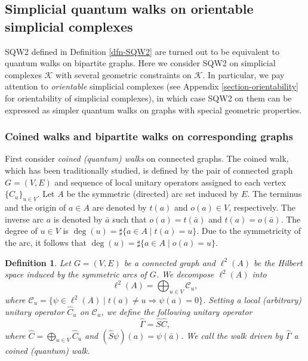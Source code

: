 \documentclass[a4paper,12pt]{article}
\newtheorem{definition}{Definition}[section]
\numberwithin{equation}{section}
\begin{document}
%
\subsection{Simplicial quantum walks on orientable simplicial complexes}
%
SQW2 defined in Definition \ref{dfn-SQW2} are turned out to be equivalent to quantum walks on bipartite graphs.
Here we consider SQW2 on simplicial complexes $\mathcal{K}$ with several geometric constraints on $\mathcal{K}$.
In particular, we pay attention to {\em orientable} simplicial complexes (see Appendix \ref{section-orientability} for orientability of simplicial complexes), in which case SQW2 on them can be expressed as simpler quantum walks on graphs with special geometric properties.


%
\subsubsection{Coined walks and bipartite walks on corresponding graphs}
First consider {\em coined (quantum) walks} on connected graphs. 
The coined walk, which has been traditionally studied, is defined by the pair of connected graph $G=(V,E)$ and sequence of local unitary operators assigned to each vertex $\{\hat{C}_u\}_{u\in V}$. 
Let $A$ be the symmetric (directed) arc set induced by $E$. The terminus and the origin of $a\in A$ are denoted by $t(a)$ and $o(a)\in V$, respectively. 
The inverse arc $a$ is denoted by $\bar{a}$ such that $o(a)=t(\bar{a})$ and $t(a)=o(\bar{a})$. 
The degree of $u\in V$ is $\deg (u)=\sharp \{ a\in A \;|\; t(a)=u \}$. 
Due to the symmetricity of the arc, it follows that $\deg (u)=\sharp \{ a\in A \;|\; o(a)=u \}$. 
\begin{definition}\rm
Let $G=(V,E)$ be a connected graph and $\ell^2(A)$ be the Hilbert space induced by the symmetric arcs of $G$. 
We decompose $\ell^2(A)$ into 
\begin{equation*}
\ell^2(A)=\bigoplus_{u\in V} \mathcal{C}_u,
\end{equation*}
where $\mathcal{C}_u=\{ \psi\in \ell^2(A) \;|\; t(a)\neq u \Rightarrow \psi(a)=0 \}$. 
Setting a local (arbitrary) unitary operator $\hat{C}_u$ on $\mathcal{C}_u$, we define the following unitary operator
\begin{equation*}
\hat{\Gamma}=\hat{S}\hat{C},
\end{equation*}
where $\hat{C}=\bigoplus_{u\in V} \hat{C}_u$ and $(\hat{S}\psi)(a)=\psi(\bar{a})$. 
We call the walk driven by $\hat{\Gamma}$ {\em a coined (quantum) walk}. 
\end{definition}
\end{document}
